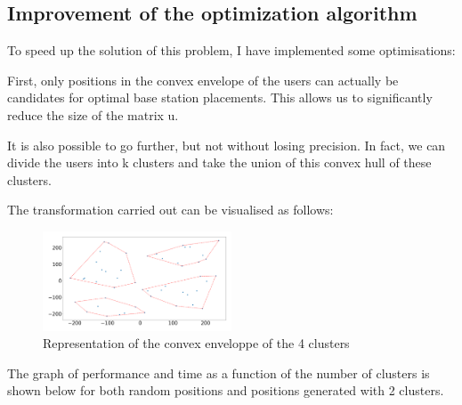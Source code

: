\documentclass[letterpaper]{article}
\begin{document}
\subsection{Improvement of the optimization algorithm}

To speed up the solution of this problem, I have implemented some optimisations:

First, only positions in the convex envelope of the users can actually be candidates for optimal base station placements.
This allows us to significantly reduce the size of the matrix u.

It is also possible to go further, but not without losing precision.
In fact, we can divide the users into k clusters and take the union of this convex hull of these clusters.

The transformation carried out can be visualised as follows:

\begin{figure}[H]
    \centering
    \includegraphics[width=0.5\textwidth]{images/four_cluster.png}
    \caption{Representation of the convex enveloppe of the 4 clusters}
\end{figure}

The graph of performance and time as a function of the number of clusters is shown below for both random positions and positions generated with 2 clusters.
\end{document}
